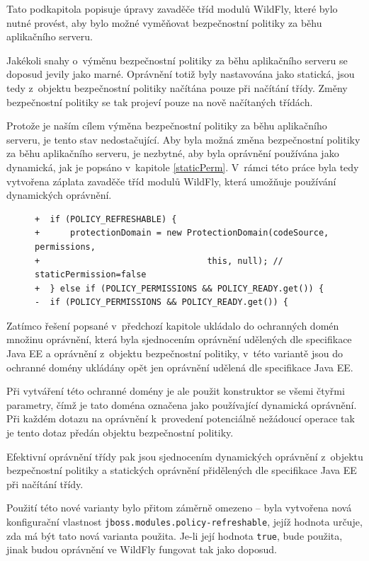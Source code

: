 Tato podkapitola popisuje úpravy zavaděče tříd modulů WildFly, které bylo nutné provést, aby bylo možné vyměňovat bezpečnostní politiky za běhu aplikačního serveru.

Jakékoli snahy o~výměnu bezpečnostní politiky za běhu aplikačního serveru se doposud jevily jako marné. Oprávnění totiž byly nastavována jako statická,
jsou tedy z~objektu bezpečnostní politiky načítána pouze při načítání třídy. Změny bezpečnostní politiky se tak projeví pouze na nově načítaných třídách.

Protože je naším cílem výměna bezpečnostní politiky za běhu aplikačního serveru, je tento stav nedostačující.
Aby byla možná změna bezpečnostní politiky za běhu aplikačního serveru, je nezbytné, aby byla oprávnění používána jako dynamická, jak je popsáno v~kapitole \ref{staticPerm}.
V~rámci této práce byla tedy vytvořena záplata zavaděče tříd modulů WildFly, která umožňuje používání dynamických oprávnění.

\begin{figure}[tbh]
\begin{lstlisting}[caption=Hlavní část záplaty umožňující nastavit používání dynamických oprávnění, label=refreshable]
+  if (POLICY_REFRESHABLE) {
+      protectionDomain = new ProtectionDomain(codeSource, permissions,
+                                 this, null); // staticPermission=false
+  } else if (POLICY_PERMISSIONS && POLICY_READY.get()) {
-  if (POLICY_PERMISSIONS && POLICY_READY.get()) {
\end{lstlisting}
\end{figure}

Zatímco řešení popsané v~předchozí kapitole ukládalo do ochranných domén množinu oprávnění,
která byla sjednocením oprávnění udělených dle specifikace Java EE a oprávnění z~objektu bezpečnostní politiky,
v~této variantě jsou do ochranné domény ukládány opět jen oprávnění udělená dle specifikace Java EE.

Při vytváření této ochranné domény je ale použit konstruktor se všemi čtyřmi parametry, čímž je tato doména označena jako používající dynamická oprávnění.
Při každém dotazu na oprávnění k~provedení potenciálně nežádoucí operace tak je tento dotaz předán objektu bezpečnostní politiky.

Efektivní oprávnění třídy pak jsou sjednocením dynamických oprávnění z~objektu bezpečnostní politiky a statických oprávnění přidělených dle specifikace Java EE při načítání třídy.

Použití této nové varianty bylo přitom záměrně omezeno -- byla vytvořena nová konfigurační vlastnost {\tt jboss.modules.policy-refreshable},
jejíž hodnota určuje, zda má být tato nová varianta použita. Je-li její hodnota {\tt true}, bude použita,
jinak budou oprávnění ve WildFly fungovat tak jako doposud.


